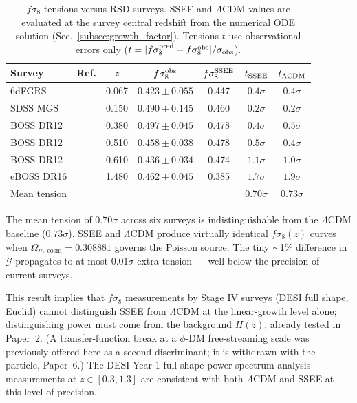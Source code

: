 \documentclass[12pt,a4paper]{article}
\begin{document}
\begin{table}[h!]
\centering
\caption{$f\sigma_8$ tensions versus RSD surveys.
  SSEE and $\Lambda$CDM values are evaluated at the survey central redshift
  from the numerical ODE solution (Sec.~\ref{subsec:growth_factor}).
  Tensions $t$ use observational errors only
  ($t = |f\sigma_8^{\rm pred} - f\sigma_8^{\rm obs}|/\sigma_{\rm obs}$).}
\label{tab:fsigma8}
\begin{tabular}{lcccccc}
\toprule
Survey & Ref. & $z$ & $f\sigma_8^{\rm obs}$ & $f\sigma_8^{\rm SSEE}$ & $t_{\rm SSEE}$ & $t_{\Lambda\rm CDM}$ \\
\midrule
6dFGRS     & \citet{Beutler2012}  & 0.067 & $0.423\pm0.055$ & 0.447 & $0.4\sigma$ & $0.4\sigma$ \\
SDSS MGS   & \citet{Howlett2015}  & 0.150 & $0.490\pm0.145$ & 0.460 & $0.2\sigma$ & $0.2\sigma$ \\
BOSS DR12  & \citet{Alam2017}     & 0.380 & $0.497\pm0.045$ & 0.478 & $0.4\sigma$ & $0.5\sigma$ \\
BOSS DR12  & \citet{Alam2017}     & 0.510 & $0.458\pm0.038$ & 0.478 & $0.5\sigma$ & $0.4\sigma$ \\
BOSS DR12  & \citet{Alam2017}     & 0.610 & $0.436\pm0.034$ & 0.474 & $1.1\sigma$ & $1.0\sigma$ \\
eBOSS DR16 & \citet{Hou2021}      & 1.480 & $0.462\pm0.045$ & 0.385 & $1.7\sigma$ & $1.9\sigma$ \\
\midrule
\multicolumn{5}{l}{Mean tension} & $0.70\sigma$ & $0.73\sigma$ \\
\bottomrule
\end{tabular}
\end{table}

The mean tension of $0.70\sigma$ across six surveys is indistinguishable
from the $\Lambda$CDM baseline ($0.73\sigma$).
SSEE and $\Lambda$CDM produce virtually identical $f\sigma_8(z)$ curves when
$\Omega_{m,\mathrm{cosm}}=0.308881$ governs the Poisson source.
The tiny $\sim$1\% difference in $\mathcal{G}$ propagates to at most $0.01\sigma$
extra tension — well below the precision of current surveys.

This result implies that $f\sigma_8$ measurements by Stage IV surveys
(DESI full shape, Euclid) cannot distinguish SSEE from $\Lambda$CDM at
the linear-growth level alone; distinguishing power must come from the
background $H(z)$, already tested in Paper~2. (A transfer-function break at a
$\phi$-DM free-streaming scale was previously offered here as a second
discriminant; it is withdrawn with the particle, Paper~6.)
The DESI Year-1 full-shape power spectrum analysis \citep{DESI2024FS}
measurements at $z\in[0.3,1.3]$ are consistent with both $\Lambda$CDM and
SSEE at this level of precision.
\end{document}
